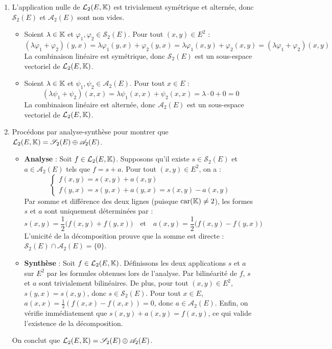 \documentclass[12pt, a4paper]{report}
\begin{document}
\begin{enumerate}
    \item L'application nulle de $\mathcal{L}_2(E, \mathbb{K})$ est trivialement symétrique et alternée, donc $\mathscr{S}_2(E)$ et $\mathscr{A}_2(E)$ sont non vides.
    \begin{itemize}
        \item Soient $\lambda \in \mathbb{K}$ et $\varphi_1, \varphi_2 \in \mathscr{S}_2(E)$. Pour tout $(x,y) \in E^2$ :
        $$(\lambda \varphi_1 + \varphi_2)(y,x) = \lambda \varphi_1(y,x) + \varphi_2(y,x) = \lambda \varphi_1(x,y) + \varphi_2(x,y) = (\lambda \varphi_1 + \varphi_2)(x,y)$$
        La combinaison linéaire est symétrique, donc $\mathscr{S}_2(E)$ est un sous-espace vectoriel de $\mathcal{L}_2(E, \mathbb{K})$.
        
        \item Soient $\lambda \in \mathbb{K}$ et $\psi_1, \psi_2 \in \mathscr{A}_2(E)$. Pour tout $x \in E$ :
        $$(\lambda \psi_1 + \psi_2)(x,x) = \lambda \psi_1(x,x) + \psi_2(x,x) = \lambda \cdot 0 + 0 = 0$$
        La combinaison linéaire est alternée, donc $\mathscr{A}_2(E)$ est un sous-espace vectoriel de $\mathcal{L}_2(E, \mathbb{K})$.
    \end{itemize}

    \item Procédons par analyse-synthèse pour montrer que $\mathcal{L}_2(E, \mathbb{K}) = \mathscr{S}_2(E) \oplus \mathscr{A}_2(E)$.
    \begin{itemize}
        \item \textbf{Analyse} : Soit $f \in \mathcal{L}_2(E, \mathbb{K})$. Supposons qu'il existe $s \in \mathscr{S}_2(E)$ et $a \in \mathscr{A}_2(E)$ tels que $f = s + a$. Pour tout $(x,y) \in E^2$, on a :
        $$
        \begin{cases}
            f(x,y) = s(x,y) + a(x,y) \\
            f(y,x) = s(y,x) + a(y,x) = s(x,y) - a(x,y)
        \end{cases}
        $$
        Par somme et différence des deux lignes (puisque $\text{car}(\mathbb{K}) \neq 2$), les formes $s$ et $a$ sont uniquement déterminées par :
        $$s(x,y) = \frac{1}{2}\bigl(f(x,y) + f(y,x)\bigr) \quad \text{et} \quad a(x,y) = \frac{1}{2}\bigl(f(x,y) - f(y,x)\bigr)$$
        L'unicité de la décomposition prouve que la somme est directe : $\mathscr{S}_2(E) \cap \mathscr{A}_2(E) = \{0\}$.
        
        \item \textbf{Synthèse} : Soit $f \in \mathcal{L}_2(E, \mathbb{K})$. Définissons les deux applications $s$ et $a$ sur $E^2$ par les formules obtenues lors de l'analyse. Par bilinéarité de $f$, $s$ et $a$ sont trivialement bilinéaires.
        De plus, pour tout $(x,y) \in E^2$, $s(y,x) = s(x,y)$, donc $s \in \mathscr{S}_2(E)$.
        Pour tout $x \in E$, $a(x,x) = \frac{1}{2}(f(x,x) - f(x,x)) = 0$, donc $a \in \mathscr{A}_2(E)$.
        Enfin, on vérifie immédiatement que $s(x,y) + a(x,y) = f(x,y)$, ce qui valide l'existence de la décomposition.
    \end{itemize}
    On conclut que $\mathcal{L}_2(E, \mathbb{K}) = \mathscr{S}_2(E) \oplus \mathscr{A}_2(E)$.


\end{enumerate}
\end{document}
